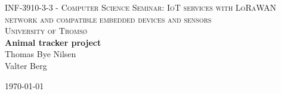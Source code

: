 \renewcommand{\partfont}{\normalfont\Huge\bfseries}
\renewcommand{\chapterfont}{\normalfont\huge\bfseries}
\renewcommand{\sectionfont}{\normalfont\LARGE\bfseries}

\usepackage{graphicx}
\graphicspath{ {images/} }





\begin{titlepage} %
	\newcommand{\HRule}{\rule{\linewidth}{0.5mm}} %
	
	\center %
	
	
	\textsc{\LARGE INF-3910-3-3 - Computer Science Seminar: IoT services with LoRaWAN network and compatible embedded devices and sensors}\\[1.5cm] %
	
	\textsc{\Large University of Tromsø}\\[0.5cm] %
	
	
	
	
	
	{\huge\bfseries Animal tracker project }\\[0.4cm] %

	
	{\Large{Thomas Bye Nilsen\\Valter Berg}}
	
	\vfill\vfill\vfill %
	
	{\large\today} %
		
	\vfill %
	
\end{titlepage}

